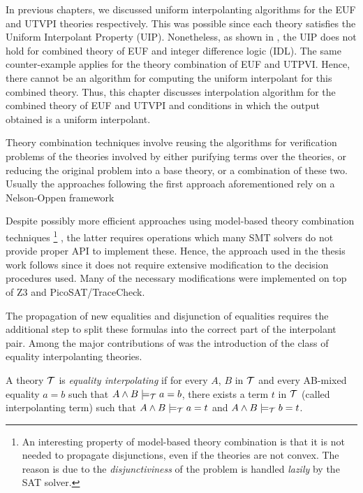 In previous chapters, we discussed uniform 
interpolanting algorithms
for the EUF and UTVPI theories respectively. 
This was possible since
each theory satisfies the Uniform Interpolant 
Property (UIP). Nonetheless, 
as shown in \cite{10.1007/978-3-030-51074-9_11}, the UIP does 
not hold for combined theory of EUF and integer 
difference logic (IDL). The same counter-example applies for the
theory combination of EUF and UTPVI. Hence, there cannot be
an algorithm for computing the uniform interpolant for this 
combined theory. Thus, this chapter discusses interpolation
algorithm for the combined theory of EUF and UTVPI and conditions
in which the output obtained is a uniform interpolant.

Theory combination techniques involve 
reusing the algorithms for verification 
problems of the theories involved 
by either purifying terms over the 
theories, or reducing the original problem 
into a base theory, or a combination of these two. 
Usually the approaches following the first approach 
aforementioned rely on a Nelson-Oppen
framework \cite{10.1007/11532231_26, 
10.1007/978-3-642-22119-4_1, 10.1145/2490253}

Despite possibly more efficient approaches using
model-based theory combination techniques 
\footnote{
  An interesting property of model-based theory combination 
  is that it is not needed to propagate disjunctions, even if
  the theories are not convex. The reason is due to 
  the \emph{disjunctiviness} of the problem is handled 
  \emph{lazily} by the
  SAT solver.
} \cite{10.1007/978-3-642-22119-4_1}, the latter requires 
operations which many SMT solvers do not provide 
proper API to implement these.
Hence, the approach used in the thesis work follows 
\cite{10.1007/11532231_26} since it does not require extensive
modification to the decision procedures
used. Many of the necessary modifications 
were implemented on top of Z3 and PicoSAT/TraceCheck.

The propagation of new equalities and disjunction of equalities
requires the additional step to split these formulas into
the correct part of the interpolant pair. Among the major
contributions of \cite{10.1007/11532231_26} was the introduction
of the class of equality interpolanting theories.

\begin{definition}
  A theory $\cal{T}$ is \emph{equality interpolating}
  if for every $A$, $B$ in $\cal{T}$ and every AB-mixed
  equality $a = b$ such that $A \land B \models_{\cal{T}} a = b$,
  there exists a term $t$
  in $\cal{T}$ (called interpolanting term)
  such that $A \land B \models_{\cal{T}} a = t$ and 
  $A \land B \models_{\cal{T}} b = t$.
\end{definition}

